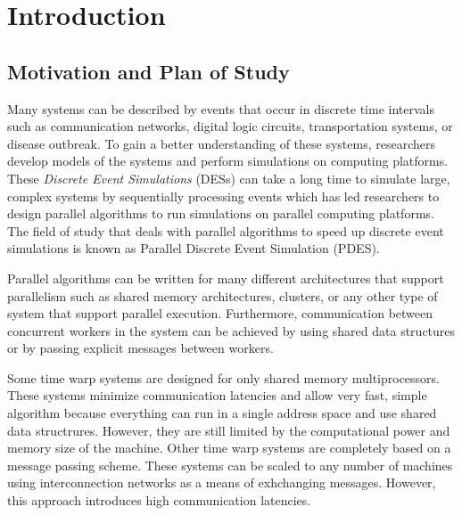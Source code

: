 \documentclass[11pt]{book}
\begin{document}
\tableofcontents \markright{ }
\listoffigures \markright{ }
\listofalgorithms \markright { }
\lstlistoflistings \markright{ }

\clearpage
{} \setcounter{page}{1}

\chapter{Introduction}\label{intro}

\section{Motivation and Plan of Study}

Many systems can be described by events that occur in discrete time intervals such as
communication networks, digital logic circuits, transportation systems, or disease
outbreak. To gain a better understanding of these systems, researchers develop models of
the systems and perform simulations on computing platforms. These \emph{Discrete Event
Simulations} (DESs) can take a long time to simulate large, complex systems by sequentially
processing events which has led researchers to design parallel algorithms to run simulations
on parallel computing platforms. The field of study that deals with parallel algorithms
to speed up discrete event simulations is known as Parallel Discrete Event Simulation (PDES).

Parallel algorithms can be written for many different architectures that support parallelism
such as shared memory architectures, clusters, or any other type of system that support
parallel execution. Furthermore, communication between concurrent workers in the system can
be achieved by using shared data structures or by passing explicit messages between workers.

Some time warp systems are designed for only shared memory multiprocessors. These systems
minimize communication latencies and allow very fast, simple algorithm because everything
can run in a single address space and use shared data structrures. However, they are still
limited by the computational power and memory size of the machine. Other time warp systems
are completely based on a message passing scheme. These systems can be scaled to any number
of machines using interconnection networks as a means of exhchanging messages. However,
this approach introduces high communication latencies.
\end{document}
